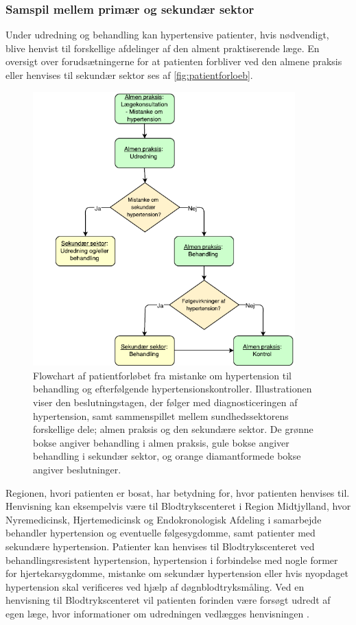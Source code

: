 \subsubsection{Samspil mellem primær og sekundær sektor}
Under udredning og behandling kan hypertensive patienter, hvis nødvendigt, blive henvist til forskellige afdelinger af den alment praktiserende læge. En oversigt over forudsætningerne for at patienten forbliver ved den almene praksis eller henvises til sekundær sektor ses af \autoref{fig:patientforloeb}. 

\begin{figure}[H]
\centering
\includegraphics[width=0.9\textwidth]{figures/patientforloeb3}
\caption{Flowchart af patientforløbet fra mistanke om hypertension til behandling og efterfølgende hypertensionskontroller. Illustrationen viser den beslutningstagen, der følger med diagnosticeringen af hypertension, samt sammenspillet mellem sundhedssektorens forskellige dele; almen praksis og den sekundære sektor. De grønne bokse angiver behandling i almen praksis, gule bokse angiver behandling i sekundær sektor, og orange diamantformede bokse angiver beslutninger.}
\label{fig:patientforloeb}
\end{figure}

Regionen, hvori patienten er bosat, har betydning for, hvor patienten henvises til. Henvisning kan eksempelvis være til Blodtrykscenteret i Region Midtjylland, hvor Nyremedicinsk, Hjertemedicinsk og Endokronologisk Afdeling i samarbejde behandler hypertension og eventuelle følgesygdomme, samt patienter med sekundære hypertension. Patienter kan henvises til Blodtrykscenteret ved behandlingsresistent hypertension, hypertension i forbindelse med nogle former for hjertekarsygdomme, mistanke om sekundær hypertension eller hvis nyopdaget hypertension skal verificeres ved hjælp af døgnblodtryksmåling. Ved en henvisning til Blodtrykscenteret vil patienten forinden være forsøgt udredt af egen læge, hvor informationer om udredningen vedlægges henvisningen \citep{aarhusuniversitetshospital}. 

